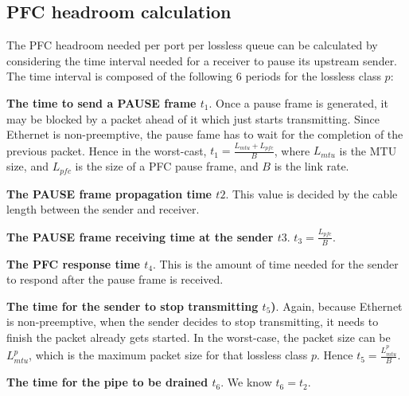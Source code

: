 \begin{appendices}
\section{PFC headroom calculation}\label{APPHEADROOM}

The PFC headroom needed per port per lossless queue can be calculated by considering the time interval needed for a receiver to pause its upstream sender. The time interval is composed of the following 6 periods for the lossless class $p$:

	
\noindent\textbf{The time to send a PAUSE frame $t_1$}.
Once a pause frame is generated, it may be blocked by a packet ahead of it which just starts transmitting. Since Ethernet is non-preemptive, the pause fame has to wait for the completion of the previous packet. Hence in the worst-cast, $t_1 = \frac{ L_{mtu} + L_{pfc}}{B}$, where $L_{mtu}$ is the MTU size, and $L_{pfc}$ is the size of a PFC pause frame, and $B$ is the link rate.


\noindent\textbf{The PAUSE frame propagation time $t2$}. This value is decided by the cable length between the sender and receiver.

\noindent\textbf{The PAUSE frame receiving time at the sender $t3$}. $t_3=\frac{L_{pfc}}{B}$.

\noindent\textbf{The PFC response time $t_4$}. This is the amount of time needed for the sender to respond after the pause frame is received.

\noindent\textbf{The time for the sender to stop transmitting $t_5$)}. Again, because Ethernet is non-preemptive, when the sender decides to stop transmitting, it needs to finish the packet already gets started. In the worst-case, the packet size can be $L^{p}_{mtu}$, which is the maximum packet size for that lossless class $p$. Hence $t_5 = \frac{L^{p}_{mtu}}{B}$.

\noindent\textbf{The time for the pipe to be drained $t_6$}. We know $t_6 = t_2$.



\end{appendices}
